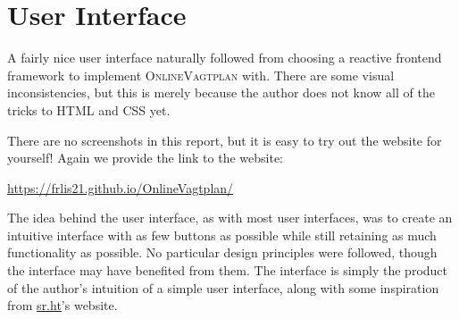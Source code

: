 \section*{User Interface}

A fairly nice user interface naturally followed
from choosing a reactive frontend framework
to implement \textsc{OnlineVagtplan} with.
There are some visual inconsistencies,
but this is merely because the author
does not know all of the tricks to HTML and CSS yet.

There are no screenshots in this report,
but it is easy to try out the website for yourself!
Again we provide the link to the website:
\begin{center}
	\url{https://frlis21.github.io/OnlineVagtplan/}
\end{center}
The idea behind the user interface,
as with most user interfaces,
was to create an intuitive interface with as few buttons as possible
while still retaining as much functionality as possible.
No particular design principles were followed,
though the interface may have benefited from them.
The interface is simply the product of the author's intuition
of a simple user interface,
along with some inspiration from
\href{https://sourcehut.org/}{sr.ht}'s
website.

